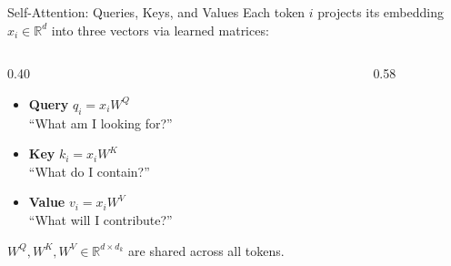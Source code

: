 \begin{frame}{Self-Attention: Queries, Keys, and Values}
  Each token $i$ projects its embedding $x_i \in \mathbb{R}^d$ into three vectors via learned matrices:

  \begin{columns}[T]
    \begin{column}{0.40\textwidth}
      \vspace{0.5em}
      \begin{itemize}\itemsep0.6em
        \item \textbf{\textcolor{violet!80!black}{Query}} $q_i = x_i W^Q$\\[2pt]
              {\small ``What am I looking for?''}
        \item \textbf{\textcolor{orange!80!black}{Key}} $k_i = x_i W^K$\\[2pt]
              {\small ``What do I contain?''}
        \item \textbf{\textcolor{cyan!60!black}{Value}} $v_i = x_i W^V$\\[2pt]
              {\small ``What will I contribute?''}
      \end{itemize}
      \vspace{0.6em}
      {\small $W^Q, W^K, W^V \!\in\! \mathbb{R}^{d \times d_k}$ are shared across all tokens.}
    \end{column}
    \begin{column}{0.58\textwidth}
      \begin{center}
\end{center}
\end{column}
\end{columns}
\end{frame}
